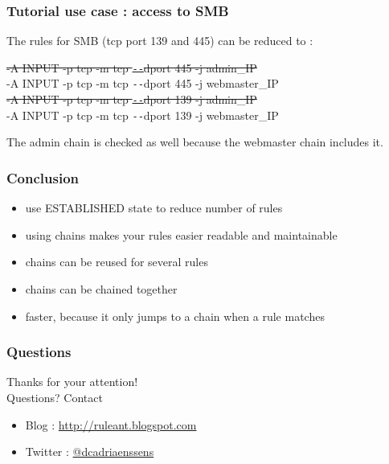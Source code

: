 \documentclass[14pt]{beamer}
\newcommand{\dd}{{\texttt{-{}-}}}
\begin{document}
  \begin{frame}
    \frametitle{Tutorial use case : access to SMB}
    The rules for SMB (tcp port 139 and 445) can be reduced to :
    \begin{example}
      \small{\sout{{\color{red}-A INPUT -p tcp -m tcp \dd dport 445 -j admin\_IP}}\\
      -A INPUT -p tcp -m tcp \dd dport 445 -j webmaster\_IP\\
      \sout{{\color{red}-A INPUT -p tcp -m tcp \dd dport 139 -j admin\_IP}}\\
      -A INPUT -p tcp -m tcp \dd dport 139 -j webmaster\_IP}
    \end{example}
  The admin chain is checked as well because the webmaster chain includes it.
  \end{frame}

  \begin{frame}
    \frametitle{Conclusion}
    \begin{itemize}
      \item use ESTABLISHED state to reduce number of rules
      \item using chains makes your rules easier readable and maintainable
      \item chains can be reused for several rules
      \item chains can be chained together
      \item faster, because it only jumps to a chain when a rule matches
    \end{itemize}
  \end{frame}
  \begin{frame}
   \frametitle{Questions}
    Thanks for your attention!\\
    Questions?
    \vfill
    Contact
    \begin{itemize}
      \item Blog : \href{http://ruleant.blogspot.com/}{http://ruleant.blogspot.com}
      \item Twitter : \href{https://twitter.com/dcadriaenssens}{@dcadriaenssens}
    \end{itemize}
  \end{frame}
\end{document}

